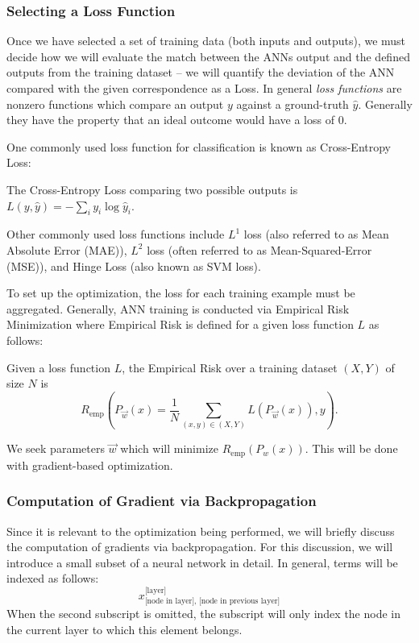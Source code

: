 \subsubsection{Selecting a Loss Function}

Once we have selected a set of training data (both inputs and outputs), we must decide how we will evaluate the match between the ANNs output and the defined outputs from the training dataset -- we will quantify the deviation of the ANN compared with the given correspondence as a Loss. In general \emph{loss functions} are nonzero functions which compare an output $y$ against a ground-truth $\hat y$. Generally they have the property that an ideal outcome would have a loss of 0. 

One commonly used loss function for classification is known as Cross-Entropy Loss:
\begin{definition}{The Cross-Entropy Loss comparing two possible outputs is}
$L(y,\hat y) = -\sum_i y_i \log \hat y_i$.
\end{definition}
Other commonly used loss functions include $L^1$ loss (also referred to as Mean Absolute Error (MAE)), $L^2$ loss (often referred to as Mean-Squared-Error (MSE)), and Hinge Loss (also known as SVM loss). 

To set up the optimization, the loss for each training example must be aggregated. Generally, ANN training is conducted via Empirical Risk Minimization where Empirical Risk is defined for a given loss function $L$ as follows:
\begin{definition}{Given a loss function $L$, the Empirical Risk over a training dataset $(X,Y)$ of size $N$ is }
\[R_{\text{emp}}(P_{\vec w}(x) = \dfrac{1}{N} \sum_{(x,y) \in (X,Y)} L(P_{\vec w}(x)), y).\]
\end{definition}
We seek parameters $\vec w$ which will minimize $R_{\text{emp}}(P_{w}(x))$. This will be done with gradient-based optimization. 

\subsubsection{Computation of Gradient via Backpropagation}

Since it is relevant to the optimization being performed, we will briefly discuss the computation of gradients via backpropagation. For this discussion, we will introduce a small subset of a neural network in detail. In general, terms will be indexed as follows:
\[ x^{\text{[layer]}}_{\text{[node in layer], [node in previous layer]}}\]
When the second subscript is omitted, the subscript will only index the node in the current layer to which this element belongs. 

